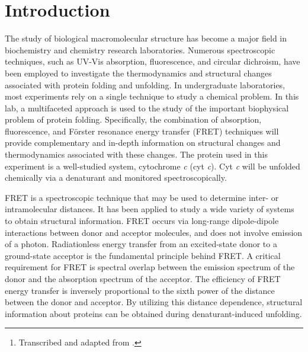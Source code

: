 \maketitle%

\begin{abstract}
\noindent
In performing this experiment, students should learn how to apply a variety of techniques to analyzing a chemical system. By using cytochrome \emph{c} as a model system, students will learn how to determine the free energy associated with unfolding a protein. Students will also learn the principles of fluorescence quenching via Förster energy transfer and then they will calculate intramolecular distances for partially unfolded and fully folded protein structures.\thanks{Transcribed and adapted from \textcite{sanchez08}.}
\end{abstract}

\section{Introduction} %

The study of biological macromolecular structure has become a major field in biochemistry and chemistry research laboratories. 
Numerous spectroscopic techniques, such as UV-Vis absorption, fluorescence, and circular dichroism, have been employed to investigate the thermodynamics and structural changes associated with protein folding and unfolding. 
In undergraduate laboratories, most experiments rely on a single technique to study a chemical problem. 
In this lab, a multifaceted approach is used to the study of the important biophysical problem of protein folding. 
Specifically, the combination of absorption, fluorescence, and Förster resonance energy transfer (FRET) techniques will provide complementary and in-depth information on structural changes and thermodynamics associated with these changes. 
The protein used in this experiment is a well-studied system, cytochrome \emph{c} (cyt \emph{c}). 
Cyt \emph{c} will be unfolded chemically via a denaturant and monitored spectroscopically. 

FRET is a spectroscopic technique that may be used to determine inter- or intramolecular distances. 
It has been applied to study a wide variety of systems to obtain structural information. 
FRET occurs via long-range dipole-dipole interactions between donor and acceptor molecules, and does not involve emission of a photon. 
Radiationless energy transfer from an excited-state donor to a ground-state acceptor is the fundamental principle behind FRET\@. 
A critical requirement for FRET is spectral overlap between the emission spectrum of the donor and the absorption spectrum of the acceptor. 
The efficiency of FRET energy transfer is inversely proportional to the sixth power of the distance between the donor and acceptor. 
By utilizing this distance dependence, structural information about proteins can be obtained during denaturant-induced unfolding. 


